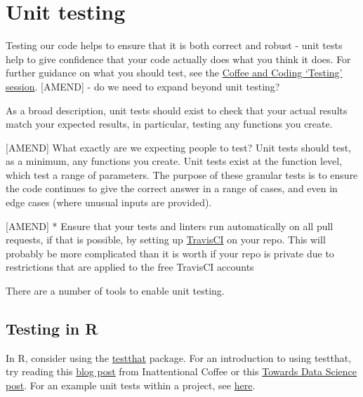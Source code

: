 \documentclass[]{book}
\begin{document}
\hypertarget{unittest}{%
\section{Unit testing}\label{unittest}}

Testing our code helps to ensure that it is both correct and robust - unit tests help to give confidence that your code actually does what you think it does. For further guidance on what you should test, see the \href{https://github.com/moj-analytical-services/coffee-and-coding-public/tree/master/2019-12-06\%20Testing\%20as\%20part\%20of\%20an\%20Analytical\%20Project}{Coffee and Coding `Testing' session}. {[}AMEND{]} - do we need to expand beyond unit testing?

As a broad description, unit tests should exist to check that your actual results match your expected results, in particular, testing any functions you create.

{[}AMEND{]} What exactly are we expecting people to test?
Unit tests should test, as a minimum, any functions you create. Unit tests exist at the function level, which test a range of parameters. The purpose of these granular tests is to ensure the code continues to give the correct answer in a range of cases, and even in edge cases (where unusual inputs are provided).

{[}AMEND{]}
* Ensure that your tests and linters run automatically on all pull requests, if that is possible, by setting up \href{https://travis-ci.org/}{TravisCI} on your repo. This will probably be more complicated than it is worth if your repo is private due to restrictions that are applied to the free TravisCI accounts

There are a number of tools to enable unit testing.

\hypertarget{testing-in-r}{%
\subsection*{Testing in R}\label{testing-in-r}}

In R, consider using the \href{https://github.com/r-lib/testthat}{testthat} package. For an introduction to using testthat, try reading this \href{https://katherinemwood.github.io/post/testthat/}{blog post} from Inattentional Coffee or this \href{https://towardsdatascience.com/unit-testing-in-r-68ab9cc8d211}{Towards Data Science post}. For an example unit tests within a project, see \href{https://github.com/RobinL/costmodelr/tree/master/tests}{here}.
\end{document}
